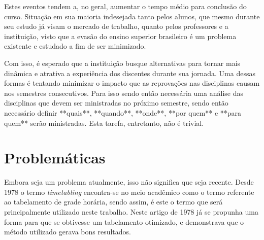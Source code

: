 
Estes eventos tendem a, no geral, aumentar o tempo médio para conclusão do curso. Situação em sua maioria indesejada tanto pelos alunos, que mesmo durante seu estudo já visam o mercado de trabalho, quanto pelos professores e a instituição, visto que a evasão do ensino superior brasileiro é um problema existente e estudado a fim de ser minimizado.


Com isso, é esperado que a instituição busque alternativas para tornar mais dinâmica e atrativa a experiência dos discentes durante sua jornada. Uma dessas formas é tentando minimizar o impacto que as reprovações nas disciplinas causam nos semestres consecutivos. Para isso sendo então necessária uma análise das disciplinas que devem ser ministradas no próximo semestre, sendo então necessário definir **quais**, **quando**, **onde**, **por quem** e **para quem** serão ministradas. Esta tarefa, entretanto, não é trivial.

\section{Problemáticas} %

    Embora seja um problema atualmente, isso não significa que seja recente. Desde 1978 \cite{barham_simple_1978} o termo \textit{timetabling} encontra-se no meio acadêmico como o termo referente ao tabelamento de grade horária, sendo assim, é este o termo que será principalmente utilizado neste trabalho. Neste artigo de 1978 já se propunha uma forma para que se obtivesse um tabelamento otimizado, e demonstrava que o método utilizado gerava bons resultados.

